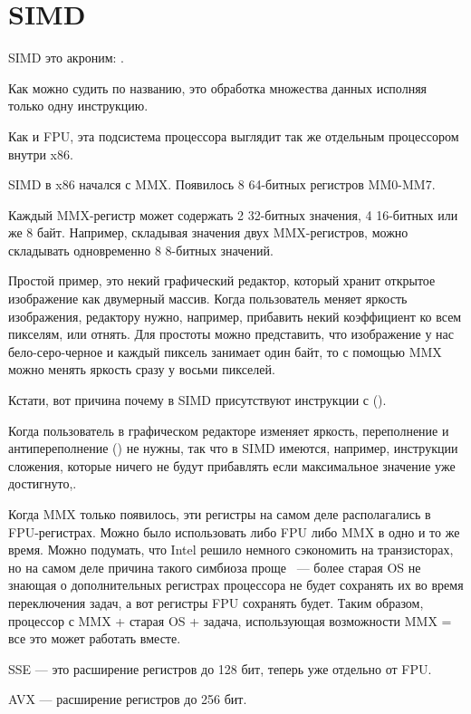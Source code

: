 \chapter{SIMD}

\label{SIMD_x86}
\ac{SIMD} это акроним: .

Как можно судить по названию, это обработка множества данных исполняя только одну инструкцию.

Как и \ac{FPU}, эта подсистема процессора выглядит так же отдельным процессором внутри x86.

SIMD в x86 начался с MMX. Появилось 8 64-битных регистров MM0-MM7.

Каждый MMX-регистр может содержать 2 32-битных значения, 4 16-битных или же 8 байт. 
Например, складывая значения двух MMX-регистров, можно складывать одновременно 8 8-битных значений.

Простой пример, это некий графический редактор, который хранит открытое изображение как двумерный массив. 
Когда пользователь меняет яркость изображения, редактору нужно, например, прибавить некий коэффициент 
ко всем пикселям, или отнять. 
Для простоты можно представить, что изображение у нас бело-серо-черное и каждый пиксель занимает один байт, 
то с помощью MMX можно менять яркость сразу у восьми пикселей.

Кстати, вот причина почему в SIMD присутствуют инструкции с  ().

Когда пользователь в графическом редакторе изменяет яркость, переполнение и антипереполнение ()
не нужны, так что в SIMD имеются, например, инструкции сложения, которые ничего не будут прибавлять
если максимальное значение уже достигнуто,\etc{}.

Когда MMX только появилось, эти регистры на самом деле располагались в FPU-регистрах. 
Можно было использовать 
либо FPU либо MMX в одно и то же время. Можно подумать, что Intel решило немного сэкономить на транзисторах, 
но на самом деле причина такого симбиоза проще ~--- более старая \ac{OS} не знающая о дополнительных 
регистрах процессора не будет сохранять их во время переключения задач, а вот регистры FPU сохранять будет. 
Таким образом, процессор с MMX + старая \ac{OS} + задача, использующая возможности MMX = все 
это может работать вместе.

SSE --- это расширение регистров до 128 бит, теперь уже отдельно от FPU.

AVX --- расширение регистров до 256 бит.

